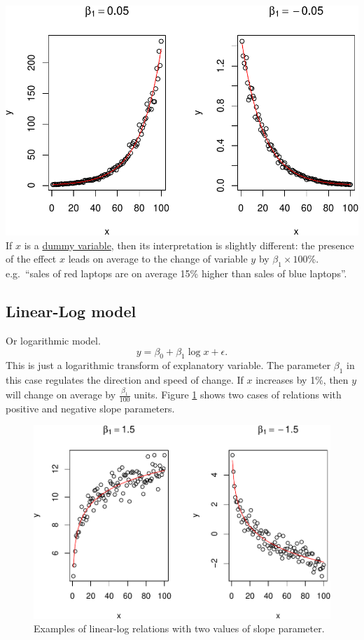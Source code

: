 \documentclass[
]{book}
\theoremstyle{definition}
\theoremstyle{definition}
\theoremstyle{definition}
\theoremstyle{definition}
\theoremstyle{remark}
\begin{document}
\includegraphics{Svetunkov---Statistics-for-Business-Analytics_files/figure-latex/transformationsExamples02-1.pdf}
If \(x\) is a \protect\hyperlink{dummyVariables}{dummy variable}, then its interpretation is slightly different: the presence of the effect \(x\) leads on average to the change of variable \(y\) by \(\beta_1 \times 100\)\%. e.g.~``sales of red laptops are on average 15\% higher than sales of blue laptops''.

\hypertarget{linear-log-model}{%
\subsection{Linear-Log model}\label{linear-log-model}}

Or logarithmic model.
\begin{equation}
    y = \beta_0 + \beta_1 \log x + \epsilon .
    \label{eq:transformLinearLog}
\end{equation}
This is just a logarithmic transform of explanatory variable. The parameter \(\beta_1\) in this case regulates the direction and speed of change. If \(x\) increases by 1\%, then \(y\) will change on average by \(\frac{\beta_1}{100}\) units. Figure \ref{fig:transformationsExamples03} shows two cases of relations with positive and negative slope parameters.

\begin{figure}
\centering
\includegraphics{Svetunkov---Statistics-for-Business-Analytics_files/figure-latex/transformationsExamples03-1.pdf}
\caption{\label{fig:transformationsExamples03}Examples of linear-log relations with two values of slope parameter.}
\end{figure}
\end{document}
